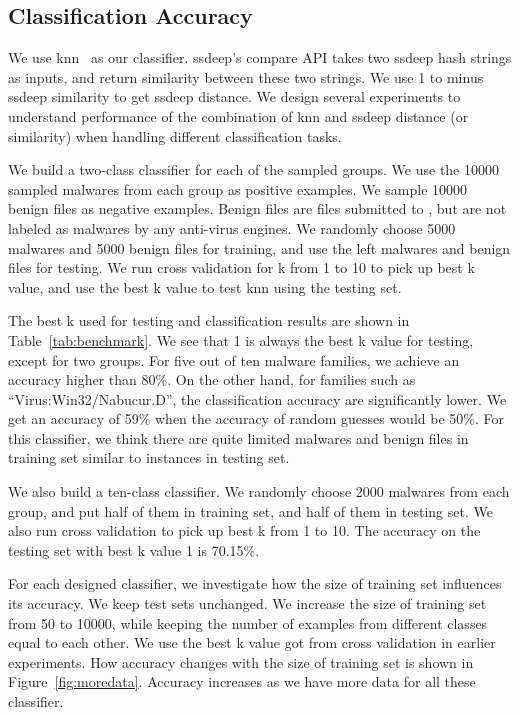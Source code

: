 \subsection{Classification Accuracy}

We use knn~\cite{knn} as our classifier.
ssdeep's compare API takes two ssdeep hash strings as inputs, 
and return similarity between these two strings. 
We use 1 to minus ssdeep similarity to get ssdeep distance.  
We design several experiments to understand performance of 
the combination of knn and ssdeep 
distance (or similarity) when handling different classification tasks. 

We build a two-class classifier for each of the sampled groups. 
We use the 10000 sampled malwares from each group as positive examples. 
We sample 10000 benign files as negative examples. 
Benign files are files submitted to \vt{}, but are not labeled as malwares by any anti-virus engines. 
We randomly choose 5000 malwares and 5000 benign files for training, 
and use the left malwares and benign files for testing. 
We run cross validation for k from 1 to 10 to pick up best k value, 
and use the best k value to test knn using the testing set. 

The best k used for testing and classification results are shown in Table~\ref{tab:benchmark}.
We see that 1 is always the best k value for testing, except for two groups.
For five out of
ten malware families, we achieve an accuracy higher than 80\%.
On the other hand, for
families such as ``Virus:Win32/Nabucur.D'',
the classification accuracy are significantly
lower. We get an accuracy of 59\% when
the accuracy of random guesses would be 50\%.
For this classifier, we think there are quite limited malwares and benign files in training set similar to instances in testing set. 

We also build a ten-class classifier.
We randomly choose 2000 malwares from each group, 
and put half of them in training set, and half of them in testing set. 
We also run cross validation to pick up best k from 1 to 10. 
The accuracy on the testing set with best k value 1 is 70.15\%. 





For each designed classifier, we investigate 
how the size of training set influences its accuracy.
We keep test sets unchanged.  
We increase the size of training set from 50 to 10000, 
while keeping the number of examples from different classes equal to each other.  
We use the best k value got from cross validation in earlier experiments.
How accuracy changes with the size of training set is shown in Figure~\ref{fig:moredata}. 
Accuracy increases as we have more data for all these classifier. 

